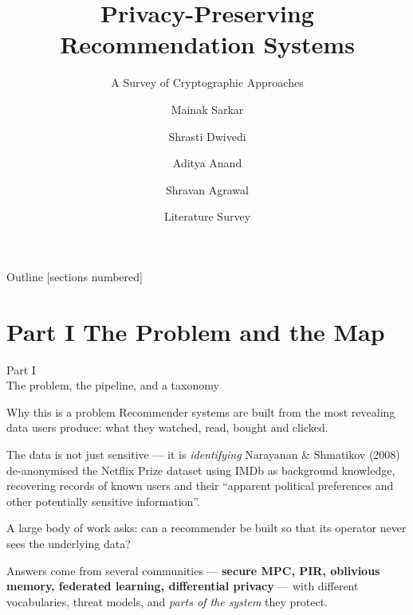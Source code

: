 \documentclass[10pt,aspectratio=169]{beamer}
\title{Privacy-Preserving Recommendation Systems}
\subtitle{A Survey of Cryptographic Approaches}
\author{Mainak Sarkar \and Shrasti Dwivedi \and Aditya Anand \and Shravan Agrawal }
\institute{CS670: Cryptographic Techniques for Privacy Preservation\\Indian Institute of Technology Kanpur}
\date{Literature Survey}
\begin{document}
 
\maketitle
 
\begin{frame}{Outline}
  [sections numbered]
  \tableofcontents[hideallsubsections]
\end{frame}
 
\section{Part I \textbar{} The Problem and the Map}
 
\begin{frame}[standout]
  Part I\\[0.4em]
  {\normalsize The problem, the pipeline, and a taxonomy}
\end{frame}
 
\begin{frame}{Why this is a problem}
  Recommender systems are built from the \alert{most revealing data users produce}: what they watched, read, bought and clicked.
 
  \begin{block}{The data is not just sensitive --- it is \emph{identifying}}
    Narayanan \& Shmatikov (2008) de-anonymised the Netflix Prize dataset using IMDb as
    background knowledge, recovering records of known users and their
    ``apparent political preferences and other potentially sensitive information''.
  \end{block}
 
  A large body of work asks: can a recommender be built so that its
  \alert{operator never sees the underlying data}?
 
  Answers come from several communities --- \textbf{secure MPC, PIR, oblivious memory,
  federated learning, differential privacy} --- with different vocabularies,
  threat models, and \emph{parts of the system} they protect.
\end{frame}
 
\end{document}
